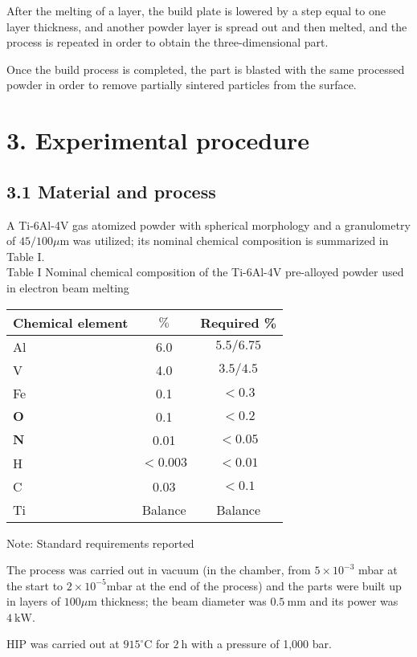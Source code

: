 \documentclass[10pt]{article}
\begin{document}
After the melting of a layer, the build plate is lowered by a step equal to one layer thickness, and another powder layer is spread out and then melted, and the process is repeated in order to obtain the three-dimensional part.

Once the build process is completed, the part is blasted with the same processed powder in order to remove partially sintered particles from the surface.

\section*{3. Experimental procedure}
\subsection*{3.1 Material and process}
A Ti-6Al-4V gas atomized powder with spherical morphology and a granulometry of $45 / 100 \mu \mathrm{m}$ was utilized; its nominal chemical composition is summarized in Table I.\\
Table I Nominal chemical composition of the Ti-6Al-4V pre-alloyed powder used in electron beam melting

\begin{center}
\begin{tabular}{lcc}
\hline
Chemical element & $\%$ & Required \% \\
\hline
Al & 6.0 & $5.5 / 6.75$ \\
V & 4.0 & $3.5 / 4.5$ \\
Fe & 0.1 & $<0.3$ \\
$\mathbf{O}$ & 0.1 & $<0.2$ \\
$\mathbf{N}$ & 0.01 & $<0.05$ \\
H & $<0.003$ & $<0.01$ \\
C & 0.03 & $<0.1$ \\
Ti & Balance & Balance \\
\end{tabular}
\end{center}

Note: Standard requirements reported

The process was carried out in vacuum (in the chamber, from $5 \times 10^{-3}$ mbar at the start to $2 \times 10^{-5} \mathrm{mbar}$ at the end of the process) and the parts were built up in layers of $100 \mu \mathrm{m}$ thickness; the beam diameter was $0.5 \mathrm{~mm}$ and its power was $4 \mathrm{~kW}$.

HIP was carried out at $915^{\circ} \mathrm{C}$ for $2 \mathrm{~h}$ with a pressure of 1,000 bar.
\end{document}
